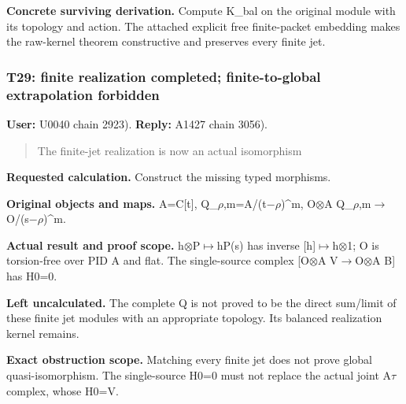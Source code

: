 \textbf{Concrete surviving derivation.} Compute K\_bal on the original
module with its topology and action. The attached explicit free
finite-packet embedding makes the raw-kernel theorem constructive and
preserves every finite jet.

\subsubsection{T29: finite realization completed; finite-to-global
extrapolation
forbidden}\label{TranscriptLedgerStage:t29-finite-realization-completed-finite-to-global-extrapolation-forbidden}

\textbf{User:} U0040
\protect{} chain 2923).
\textbf{Reply:} A1427
\protect{} chain 3056).

\begin{quote}
The finite-jet realization is now an actual isomorphism
\end{quote}

\textbf{Requested calculation.} Construct the missing typed morphisms.

\textbf{Original objects and maps.} A=C{[}t{]},
Q\_\allowbreak{}\ensuremath{ρ}\allowbreak{},m=A/(t\allowbreak{}\ensuremath{−}\allowbreak{}\allowbreak{}\ensuremath{ρ}\allowbreak{})\textasciicircum{}m,
O\allowbreak{}\ensuremath{⊗}\allowbreak{}A
Q\_\allowbreak{}\ensuremath{ρ}\allowbreak{},m\allowbreak{}\ensuremath{→}\allowbreak{}O/(s\allowbreak{}\ensuremath{−}\allowbreak{}\allowbreak{}\ensuremath{ρ}\allowbreak{})\textasciicircum{}m.

\textbf{Actual result and proof scope.}
h\allowbreak{}\ensuremath{⊗}\allowbreak{}P\allowbreak{}\ensuremath{↦}\allowbreak{}hP(s)
has inverse
[h]\allowbreak{}\ensuremath{↦}\allowbreak{}h\allowbreak{}\ensuremath{⊗}\allowbreak{}1;
O is torsion-free over PID A and flat. The single-source complex
[O\allowbreak{}\ensuremath{⊗}\allowbreak{}A
V\allowbreak{}\ensuremath{→}\allowbreak{}O\allowbreak{}\ensuremath{⊗}\allowbreak{}A
B{]} has H0=0.

\textbf{Left uncalculated.} The complete Q is not proved to be the
direct sum/limit of these finite jet modules with an appropriate
topology. Its balanced realization kernel remains.

\textbf{Exact obstruction scope.} Matching every finite jet does not
prove global quasi-isomorphism. The single-source H0=0 must not replace
the actual joint A\allowbreak{}\ensuremath{τ}\allowbreak{} complex,
whose H0=V.

